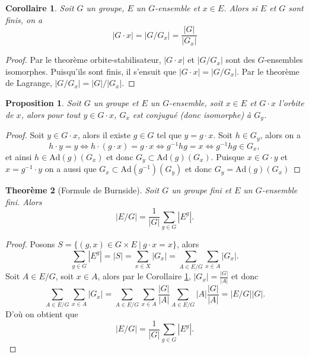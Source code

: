 \documentclass[french]{article}
\theoremstyle{plain}
\newtheorem{thm}{Theorème}[section]
\newtheorem{cor}{Corollaire}[thm]
\newtheorem{prop}[thm]{Proposition}
\theoremstyle{remark}
\theoremstyle{definition}
\newcommand{\Ad}{\mathrm{Ad}}
\begin{document}
\begin{cor}
	\label{formule-orbite-stabilisateur}
	Soit $G$ un groupe, $E$ un $G$-ensemble et $x \in E$. Alors si $E$ et $G$ sont finis, on a
	\begin{equation*}
		|G \cdot x| = |G/G_x| = \frac{|G|}{|G_x|}
	\end{equation*}
\end{cor}

\begin{proof}
	Par le theorème orbite-stabilisateur, $|G \cdot x|$ et $|G/G_x|$
	sont des $G$-ensembles isomorphes. Puisqu'ils sont finis,
	il s'ensuit que $|G \cdot x| = |G/G_x|$.
	Par le theorème de Lagrange, $|G/G_x| = |G|/|G_x|$.
\end{proof}

\begin{prop}
	\label{stab-conjugue}
	Soit $G$ un groupe et $E$ un $G$-ensemble, soit $x \in E$ et
	$G \cdot x$ l'orbite de $x$, alors pour tout $y \in G \cdot x$,
	$G_x$ est conjugué (donc isomorphe) à $G_y$.
\end{prop}

\begin{proof}
	Soit $y \in G \cdot x$, alors il existe $g \in G$ tel que $y = g \cdot x$.
	Soit $h \in G_y$, alors on a
	\begin{equation*}
		h \cdot y = y \iff h \cdot (g \cdot x) = g \cdot x \iff
		g^{-1} h g = x \iff g^{-1} h g \in G_x,
	\end{equation*}
	et ainsi $h \in \Ad(g)(G_x)$ et donc $G_y \subset \Ad(g)(G_x)$.
	Puisque $x \in G \cdot y$ et $x = g^{-1} \cdot y$ on a 
	aussi que $G_x \subset \Ad(g^{-1})(G_y)$ et donc $G_y = \Ad(g)(G_x)$
\end{proof}


\begin{thm}[Formule de Burnside]
	Soit $G$ un groupe fini et $E$ un $G$-ensemble fini. Alors
	\begin{equation*}
		|E/G| = \frac{1}{|G|}\sum_{g \in G}|E^g|.
	\end{equation*}
\end{thm}

\begin{proof}
	Posons $S = \{(g, x) \in G \times E\ |\ g \cdot x = x\}$, alors
	\begin{equation*}
		\sum_{g \in G} |E^g| = |S| = 
		\sum_{x \in X} |G_x| = \sum_{A \in E/G} \sum_{x \in A} |G_x|.
	\end{equation*}
	Soit $A \in E/G$, soit $x \in A$, alors par le Corollaire
	\ref{formule-orbite-stabilisateur}, $|G_x| = \frac{|G|}{|A|}$ et donc
	\begin{equation*}
		\sum_{A \in E/G} \sum_{x \in A} |G_x| = \sum_{A \in E/G} \sum_{x \in A}\frac{|G|}{|A|}
		\sum_{A \in E/G} |A|\frac{|G|}{|A|} = |E/G||G|.
	\end{equation*}
	D'où on obtient que
	\begin{equation*}
		|E/G| = \frac{1}{|G|}\sum_{g \in G}|E^g|.
	\end{equation*}
\end{proof}
\end{document}
